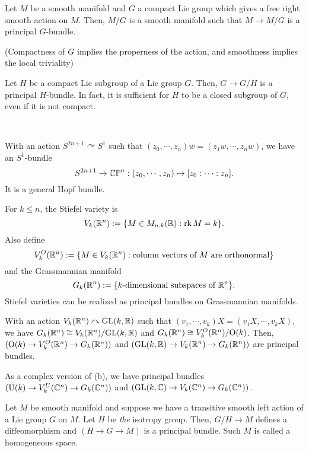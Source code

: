 \documentclass{../../small}
\begin{document}
\begin{thm}[Gleason, 1950]
Let $M$ be a smooth manifold and $G$ a compact Lie group which gives a free right smooth action on $M$.
Then, $M/G$ is a smooth manifold such that $M\to M/G$ is a principal $G$-bundle.
\end{thm}
(Compactness of $G$ implies the properness of the action, and smoothness implies the local triviality)
\begin{cor}[Samelson, 1941]
Let $H$ be a compact Lie subgroup of a Lie group $G$.
Then, $G\to G/H$ is a principal $H$-bundle.
In fact, it is sufficient for $H$ to be a closed subgroup of $G$, even if it is not compact.
\end{cor}
\begin{ex*}\,
\begin{parts}
\item
With an action $S^{2n+1}\curvearrowright S^1$ such that $(z_0,\cdots,z_n)w=(z_1w,\cdots,z_nw)$, we have an $S^1$-bundle
\[S^{2n+1}\to\mathbb{CP}^n:(z_0,\cdots,z_n)\mapsto[z_0:\cdots:z_n].\]
It is a general Hopf bundle.
\item
For $k\le n$, the Stiefel variety is
\[V_k(\mathbb{R}^n):=\{M\in M_{n,k}(\mathbb{R}):\operatorname{rk} M=k\}.\]
Also define
\[V_k^O(\mathbb{R}^n):=\{M\in V_k(\mathbb{R}^n):\text{column vectors of $M$ are orthonormal}\}\]
and the Grassmannian manifold
\[G_k(\mathbb{R}^n):=\{\text{$k$-dimensional subspaces of $\mathbb{R}^n$}\}.\]
Stiefel varieties can be realized as principal bundles on Grassmannian manifolds.

With an action $V_k(\mathbb{R}^n)\curvearrowright\mathrm{GL}(k,\mathbb{R})$ such that $(v_1,\cdots,v_k)X=(v_1X,\cdots,v_kX)$, we have $G_k(\mathbb{R}^n)\cong V_k(\mathbb{R}^n)/\mathrm{GL}(k,\mathbb{R})$ and $G_k(\mathbb{R}^n)\cong V_k^O(\mathbb{R}^n)/\mathrm{O}(k)$.
Then, $(\mathrm{O}(k)\to V_k^O(\mathbb{R}^n)\to G_k(\mathbb{R}^n))$ and $(\mathrm{GL}(k,\mathbb{R})\to V_k(\mathbb{R}^n)\to G_k(\mathbb{R}^n))$ are principal bundles.
\item
As a complex version of (b), we have principal bundles $(\mathrm{U}(k)\to V_k^U(\mathbb{C}^n)\to G_k(\mathbb{C}^n))$ and $(\mathrm{GL}(k,\mathbb{C})\to V_k(\mathbb{C}^n)\to G_k(\mathbb{C}^n))$.
\end{parts}
\end{ex*}


\begin{thm}
Let $M$ be smooth manifold and suppose we have a transitive smooth left action of a Lie group $G$ on $M$.
Let $H$ be \emph{the} isotropy group.
Then, $G/H\to M$ defines a diffeomorphism and $(H\to G\to M)$ is a principal bundle.
Such $M$ is called a homogeneous space.
\end{thm}
\end{document}
